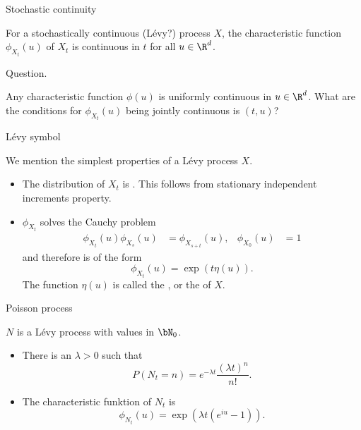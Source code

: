 \begin{frame}
    {Stochastic continuity}
        
    \begin{theorem}
        For a stochastically continuous (L\'evy?) process $X$, the
        characteristic function $\phi_{X_t}(u)$ of $X_t$ is continuous in $t$
        for all $u\in\R^{d}$. 
    \end{theorem}

    Question. 

    Any characteristic function $\phi(u)$ is uniformly continuous in $u\in\R^d$.
    What are the conditions for $\phi_{X_t}(u)$ being jointly continuous
    is $(t,u)$?
\end{frame}


\begin{frame}
    {L\'evy symbol}
   
    We mention the simplest properties of a L\'evy process $X$.

    \begin{itemize}
        \item The distribution of $X_t$ is . This 
            follows from stationary independent increments property. 
        \item $\phi_{X_t}$ solves the Cauchy problem
            \begin{align*}
                \phi_{X_t}(u)\phi_{X_s}(u) &= \phi_{X_{s+t}}(u), & 
                \phi_{X_0}(u)&=1
            \end{align*}
            and therefore is of the form
            \begin{equation*}
                \phi_{X_t}(u) = \exp \left( t \eta(u) \right).
            \end{equation*}
            The function $\eta(u)$ is called the ,
            or the  of $X$. 
    \end{itemize}
\end{frame}


\begin{frame}
    {Poisson process}

    \begin{definition}
         $N$ is a L\'evy process with values in $\bN_0$. 
    \end{definition}

    \begin{itemize}
        \item There is an $\lambda>0$ such that
            \begin{equation*}
                P(N_t = n) = e^{-\lambda t} \frac{(\lambda t)^n}{n!}. 
            \end{equation*}
        \item The characteristic funktion of $N_t$ is
            \begin{equation*}
                \phi_{N_t}(u) = \exp \left( \lambda t \left( e^{iu}-1 \right) \right).  
            \end{equation*}
    \end{itemize}
\end{frame}


